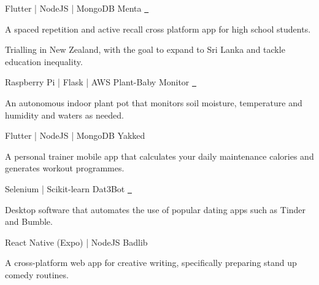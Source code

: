 
\begin{cventries}
 
  \cventry 
    {  Flutter | NodeJS | MongoDB } %
    { Menta\; \href{https://github.com/mentanz/menta-app}{\faGithub\ \extlink}	} %
	{} %
    {} %
    {
      \begin{cvitems} %
      	\item { A spaced repetition and active recall cross platform app for high school students. }
		\item{ Trialling in New Zealand, with the goal to expand to Sri Lanka and tackle education inequality. }
      \end{cvitems}
    }

  \cventry 
    { Raspberry Pi | Flask | AWS } %
    { Plant-Baby Monitor\; \href{https://github.com/yohanderose/PlantBabyMonitor-IOT}{\faGithub\ \extlink}	} %
	{} %
    {} %
    {
      \begin{cvitems} %
      	\item { An autonomous indoor plant pot that monitors soil moisture, temperature and humidity and waters as needed. }
      \end{cvitems}
    }

  \cventry
    { Flutter | NodeJS | MongoDB } %
    {Yakked} %
    {} %
    {} %
    {
      \begin{cvitems} %
      	\item { A personal trainer mobile app that calculates your daily maintenance calories and generates workout programmes. }
      \end{cvitems}
    }

  \cventry
    { Selenium | Scikit-learn } %
    {Dat3Bot\; \href{https://github.com/yohanderose/Dat3Bot}{\faGithub\ \extlink}	 } %
    {} %
    {} %
    {
      \begin{cvitems} %
      	\item { Desktop software that automates the use of popular dating apps such as Tinder and Bumble. }
      \end{cvitems}
    }

  \cventry
    { React Native (Expo) | NodeJS } %
    {Badlib} %
    {} %
    {} %
    {
      \begin{cvitems} %
      	\item { A cross-platform web app for creative writing, specifically preparing stand up comedy routines.}
      \end{cvitems}
    }
    

\end{cventries}
